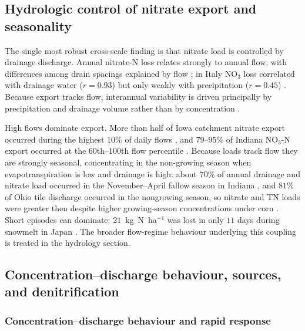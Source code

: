 \subsection{Hydrologic control of nitrate export and seasonality}

The single most robust cross-scale finding is that nitrate load is controlled
by drainage discharge. Annual nitrate-N loss relates strongly to annual flow,
with differences among drain spacings explained by flow
\parencite{Kladivko2021,Bauwe2020}; in Italy NO$_3$ loss correlated with
drainage water ($r=0.93$) but only weakly with precipitation ($r=0.45$)
\parencite{ROSSI1991}. Because export tracks flow, interannual variability is
driven principally by precipitation and drainage volume rather than by
concentration \parencite{Danalatos2022,BAKER1975}.

High flows dominate export. More than half of Iowa catchment nitrate export
occurred during the highest $10\%$ of daily flows \parencite{Ikenberry2014},
and $79$--$95\%$ of Indiana NO$_3$-N export occurred at the 60th--100th flow
percentile \parencite{Speir2021}. Because loads track flow they are strongly
seasonal, concentrating in the non-growing season when evapotranspiration is
low and drainage is high: about $70\%$ of annual drainage and nitrate load
occurred in the November--April fallow season in Indiana
\parencite{Kladivko2021,Kladivko2004}, and $81\%$ of Ohio tile discharge
occurred in the nongrowing season, so nitrate and TN loads were greater then
despite higher growing-season concentrations under corn \parencite{King2016}.
Short episodes can dominate: $21$~kg~N~ha$^{-1}$ was lost in only $11$ days
during snowmelt in Japan \parencite{Hayashi1999}. The broader flow-regime
behaviour underlying this coupling is treated in the hydrology section.

\subsection{Concentration--discharge behaviour, sources, and denitrification}

\subsubsection{Concentration--discharge behaviour and rapid response}

